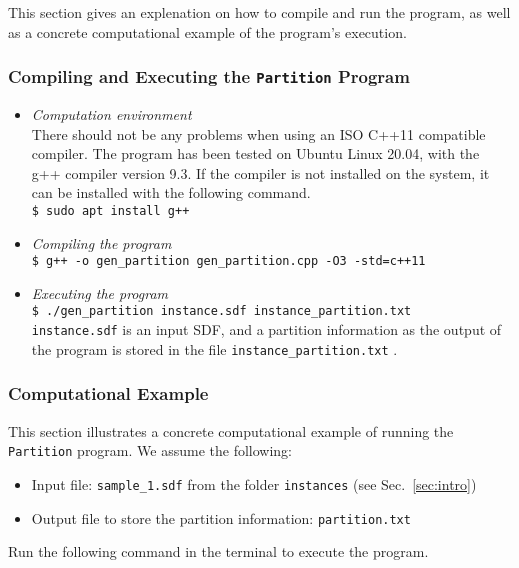 \documentclass[11pt,titlepage,dvipdfmx,twoside]{article}
\begin{document}
This section gives an explenation on how to compile and run the program,
as well as a concrete computational example of the program's execution.


\subsubsection{Compiling and Executing the {\tt Partition} Program}
\label{sec:compile_p}
\begin{itemize}
	\item {\em Computation environment}\\
		There should not be any problems when using an ISO C++11 compatible compiler. %
		The program has been tested on 
		Ubuntu Linux 20.04,  with the  g++ compiler version 9.3.
		If the compiler is not installed on the system, it can be installed with
		the following command.\\
		\verb|$ sudo apt install g++|
	\item {\em Compiling the program}\\
		\verb|$ g++ -o gen_partition gen_partition.cpp -O3 -std=c++11|\\
	\item {\em Executing the program}\\
		\verb|$ ./gen_partition instance.sdf instance_partition.txt|\\
		\verb|instance.sdf|  is an input SDF, 
		and a partition information as the output of the program is stored in the file
	  \verb|instance_partition.txt| .
\end{itemize}


\subsubsection{Computational Example}
\label{sec:instance_p}

This section illustrates a concrete computational 
example of running the {\tt Partition} program.
We assume the following:
%
\begin{itemize}
\item Input file: {\tt sample\_1.sdf} from the folder {\tt instances} (see Sec.~\ref{sec:intro})
\item Output file to store the partition information: {\tt partition.txt}
\end{itemize}

Run the following command in the terminal to execute the program.

\bigskip
\end{document}
